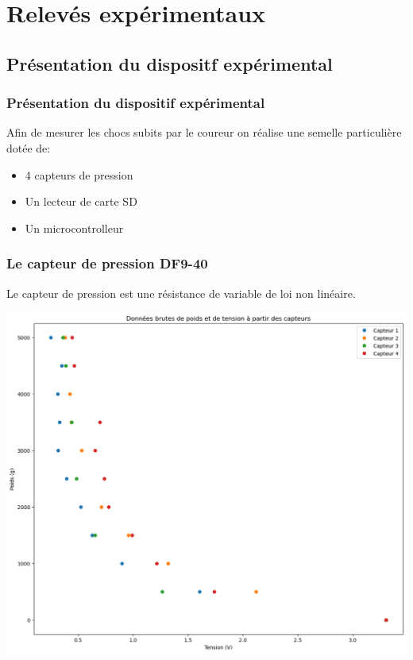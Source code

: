 \section{Relevés expérimentaux}
\subsection{Présentation du dispositf expérimental}
\begin{frame}
\frametitle{Présentation du dispositif expérimental}
Afin de mesurer les chocs subits par le coureur on réalise une semelle particulière dotée de:
\begin{itemize}
\item 4 capteurs de pression
\item Un lecteur de carte SD
\item Un microcontrolleur
\end{itemize}
\end{frame}

\begin{frame}
\frametitle{Le capteur de pression DF9-40}
Le capteur de pression est une résistance de variable de loi non linéaire.
\begin{center}
\includegraphics[scale=0.3]{./figures/cal_00.png}
\end{center}
\end{frame}

